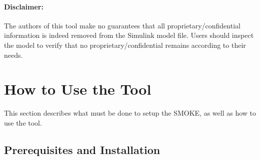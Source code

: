 \documentclass{article}
\makeatletter
\newcommand{\toolname}{SMOKE\@\xspace}
\makeatother
\begin{document}
\paragraph{Disclaimer:} The authors of this tool make no guarantees that all proprietary/confidential information is indeed removed from the Simulink model file. Users should inspect the model to verify that no proprietary/confidential remains according to their needs.

%
	
\section{How to Use the Tool}
This section describes what must be done to setup the \toolname, as well as how to use the tool.

\subsection{Prerequisites and Installation}
\end{document}
